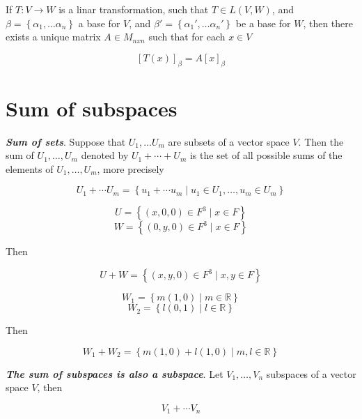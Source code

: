 \documentclass{report}
\begin{document}
    \begin{thBox}
        If $T: V \to W$ is a linar transformation, such that $T \in L(V, W)$, and $\beta = \left\{ \alpha_1, \dots \alpha_n \right\}$ a base for $V$, and $\beta' = \left\{ \alpha_1', \dots \alpha_n' \right\}$ be a base for $W$, then there exists a unique matrix $A \in M_{nxn}$ such that for each $x \in V$

        $$[T(x)]_\beta = A[x]_\beta$$
    \end{thBox}

    \section{Sum of subspaces}

    \begin{defBox}
        \textit{\textbf{Sum of sets}}. Suppose that $U_1, \dots U_m$ are subsets of a vector space $V$. Then the sum of $U_1, \dots , U_m$ denoted by $U_1 + \cdots + U_m $ is the set of all possible sums of the elements of $U_1, \dots , U_m$, more precisely

        $$U_1 + \cdots U_m = \left\{ u_1 + \cdots u_m \mid u_1 \in U_1 , \dots , u_m \in U_m \right\}$$
    \end{defBox}

    \begin{Example}
        $$U = \left\{ (x, 0, 0) \in F^3 \mid x \in F \right\}$$
        $$W = \left\{ (0, y, 0) \in F^3 \mid x \in F \right\}$$

        Then

        $$U + W = \left\{ (x, y, 0) \in F^3 \mid x, y \in F \right\}$$
    \end{Example}

    \begin{Example}
        $$W_1 = \left\{ m(1,0) \mid m \in \mathbb{R} \right\}$$
        $$W_2 = \left\{ l(0,1) \mid l \in \mathbb{R} \right\}$$

        Then

        $$W_1 + W_2 = \left\{ m(1,0) + l(1,0) \mid m, l \in \mathbb{R} \right\}$$
    \end{Example}

    \begin{thBox}
        \textit{\textbf{The sum of subspaces is also a subspace}}. Let $V_1, \dots , V_n$ subspaces of a vector space $V$, then

        $$ V_1 + \cdots V_n $$
    \end{thBox}


\end{document}
